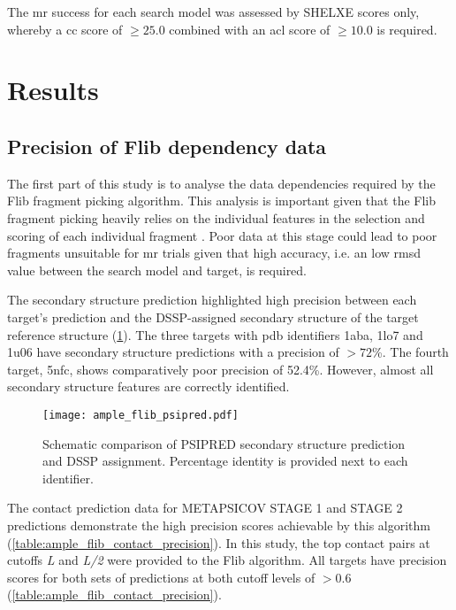 The \gls{mr} success for each search model was assessed by SHELXE scores only, whereby a \gls{cc} score of $\geq25.0$ combined with an \gls{acl} score of $\geq10.0$ is required.


\section{Results}
\subsection{Precision of Flib dependency data}
The first part of this study is to analyse the data dependencies required by the Flib fragment picking algorithm. This analysis is important given that the Flib fragment picking heavily relies on the individual features in the selection and scoring of each individual fragment \cite{De_Oliveira2015-ba}. Poor data at this stage could lead to poor fragments unsuitable for \gls{mr} trials given that high accuracy, i.e. an low \gls{rmsd} value between the search model and target, is required.

The secondary structure prediction highlighted high precision between each target's prediction and the DSSP-assigned \cite{Frishman1995-ns} secondary structure of the target reference structure (\cref{fig:ample_flib_psipred}). The three targets with \gls{pdb} identifiers 1aba, 1lo7 and 1u06 have secondary structure predictions with a precision of $>72$\%. The fourth target, 5nfc, shows comparatively poor precision of 52.4\%. However, almost all secondary structure features are correctly identified.

\begin{figure}[H]
	\centering
	\texttt{[image: ample\_flib\_psipred.pdf]}
	\caption[PSIPRED schema for Flib targets]{Schematic comparison of PSIPRED \cite{Jones1999-fi} secondary structure prediction and DSSP \cite{Frishman1995-ns} assignment. Percentage identity is provided next to each identifier.}
	\label{fig:ample_flib_psipred}
\end{figure}

The contact prediction data for METAPSICOV STAGE 1 and STAGE 2 predictions demonstrate the high precision scores achievable by this algorithm (\cref{table:ample_flib_contact_precision}). In this study, the top contact pairs at cutoffs \textit{L} and \textit{L/2} were provided to the Flib algorithm. All targets have precision scores for both sets of predictions at both cutoff levels of $>0.6$ (\cref{table:ample_flib_contact_precision}).

